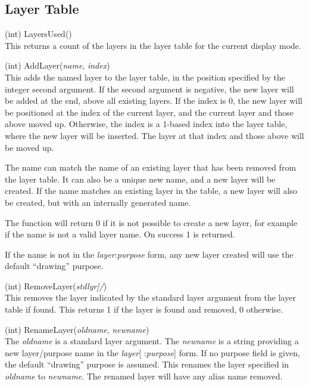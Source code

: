 \subsection{Layer Table}

\begin{description}
\item{(int) \vt LayersUsed()}\\
This returns a count of the layers in the layer table for the current
display mode.

\item{(int) \vt AddLayer({\it name\/}, {\it index\/})}\\
This adds the named layer to the layer table, in the position
specified by the integer second argument.  If the second argument is
negative, the new layer will be added at the end, above all existing
layers.  If the index is 0, the new layer will be positioned at the
index of the current layer, and the current layer and those above
moved up.  Otherwise, the index is a 1-based index into the layer
table, where the new layer will be inserted.  The layer at that index
and those above will be moved up.

The name can match the name of an existing layer that has been
removed from the layer table.  It can also be a unique new name,
and a new layer will be created.  If the name matches an existing
layer in the table, a new layer will also be created, but with an
internally generated name.

The function will return 0 if it is not possible to create a new
layer, for example if the name is not a valid layer name.  On
success 1 is returned.

If the name is not in the {\it layer\/}{\vt :}{\it purpose} form, any
new layer created will use the default ``{\vt drawing}'' purpose.

\item{(int) \vt RemoveLayer({\it stdlyr]/})}\\
This removes the layer indicated by the standard layer argument from
the layer table if found.  This returns 1 if the layer is found and
removed, 0 otherwise.

\item{(int) \vt RenameLayer({\it oldname\/}, {\it newname\/})}\\
The {\it oldname} is a standard layer argument.  The {\it newname} is
a string providing a new layer/purpose name in the {\it layer\/}[{\vt
:}{\it purpose\/}] form.  If no purpose field is given, the default
``{\vt drawing}'' purpose is assumed.  This renames the layer
specified in {\it oldname} to {\it newname\/}.  The renamed layer will
have any alias name removed.


\end{description}

